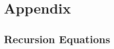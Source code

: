 \documentclass[12pt]{article}
\begin{document}














\setcounter{equation}{0}
\renewcommand{\theequation}{S.\arabic{equation}}
\setcounter{figure}{0}
\renewcommand{\thefigure}{S.\arabic{figure}}
\setcounter{table}{0}
\renewcommand{\thetable}{S.\arabic{table}}

\newpage

\section*{Appendix}

\subsection*{Recursion Equations}
\label{app:recurs}
\end{document}
